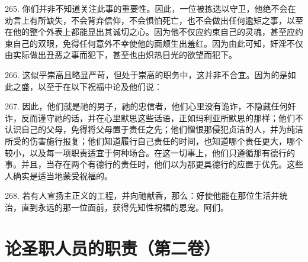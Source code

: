 265. 你们并非不知道关注此事的重要性。因此，一位被拣选以守卫，他绝不会在劝言上有所缺失，不会背弃信仰，不会惧怕死亡，也不会做出任何逾矩之事，以至在他的整个外表上都能显出其诚切之心。因为他不仅应约束自己的灵魂，甚至应约束自己的双眼，免得任何意外不幸使他的面颊生出羞红。因为由此可知，奸淫不仅由实际做出丑恶之事而犯下，甚至也由炽热目光的欲望而犯下。\par

266. 这似乎崇高且略显严苛，但处于崇高的职务中，这并非不合宜。因为的是如此之盛，以至于在以下祝福中论及他们说：\par

267. 因此，他们就是祂的男子，祂的忠信者，他们心里没有诡诈，不隐藏任何奸诈，反而谨守祂的话，并在心里默思这些话语，正如玛利亚所默思的那样；他们不认识自己的父母，免得将父母置于责任之先；他们憎恨那侵犯贞洁的人，并为纯洁所受的伤害施行报复；他们知道履行自己责任的时间，也知道哪个责任更大，哪个较小，以及每一项职责适宜于何种场合。在这一切事上，他们只遵循那有德行的事。并且，当存在两个有德行的责任时，他们以为那更具德行的应置于优先。这些人确实是适当地蒙受祝福的。\par

268. 若有人宣扬主正义的工程，并向祂献香，那么：好使他能在那位生活并统治，直到永远的那一位面前，获得先知性祝福的恩宠。阿们。\par



\section{论圣职人员的职责（第二卷）}



